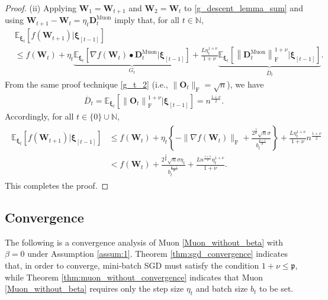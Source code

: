 \documentclass[twoside,11pt]{article}
\begin{document}
\begin{proof}
(ii) Applying $\bm{W}_1 = \bm{W}_{t+1}$ and $\bm{W}_2 = \bm{W}_t$ to \eqref{g_descent_lemma_sum} and using $\bm{W}_{t+1} - \bm{W}_t = \eta_t \bm{D}_t^{\mathrm{Muon}}$ imply that, for all $t \in \mathbb{N}$,
\begin{align*}
&\mathbb{E}_{\bm{\xi}_t} \left[ f(\bm{W}_{t+1})|\bm{\xi}_{[t-1]} \right]\\
&\leq 
f(\bm{W}_t) 
+ \eta_t 
\underbrace{\mathbb{E}_{\bm{\xi}_t} \left[ \nabla f (\bm{W}_t) \bullet \bm{D}_t^{\mathrm{Muon}} |\bm{\xi}_{[t-1]} \right]}_{G_t}
+ \frac{L \eta_t^{1 + \nu}}{1 + \nu} 
\underbrace{\mathbb{E}_{\bm{\xi}_t} \left[
\left\| \bm{D}_t^{\mathrm{Muon}} \right\|_{\mathrm{F}}^{1 + \nu} \Big| \bm{\xi}_{[t-1]} \right]}_{\overline{D}_t}.
\end{align*}
From the same proof technique \eqref{g_t_2} (i.e., $\|\bm{O}_t \|_{\mathrm{F}} = \sqrt{n}$), we have 
\begin{align}\label{bar_d_t}
\overline{D}_t
= 
\mathbb{E}_{\bm{\xi}_t} \left[
\left\| \bm{O}_t \right\|_{\mathrm{F}}^{1 + \nu} \Big| \bm{\xi}_{[t-1]} \right]
= n^{\frac{1 + \nu}{2}}.
\end{align}
Accordingly, for all $t \in \{0\} \cup \mathbb{N}$,
\begin{align}\label{ineq_muon_without}
\begin{split}
\mathbb{E}_{\bm{\xi}_t} \left[ f(\bm{W}_{t+1})|\bm{\xi}_{[t-1]} \right]
&\leq 
f(\bm{W}_t) 
+ \eta_t 
\left\{ - \| \nabla f (\bm{W}_t) \|_{\mathrm{F}}
+ 
\frac{2^{\frac{2}{\mathfrak{p}}} \sqrt{n} \sigma}{b_t^{\frac{\mathfrak{p} -1}{\mathfrak{p}}}} \right\} 
+ \frac{L \eta_t^{1 + \nu}}{1 + \nu} 
n^{\frac{1 + \nu}{2}}\\
&< 
f(\bm{W}_t)
+
\frac{2^{\frac{2}{\mathfrak{p}}} \sqrt{n} \sigma \eta_t}{b_t^{\frac{\mathfrak{p} -1}{\mathfrak{p}}}}
+ 
\frac{L n^{\frac{1 + \nu}{2}} \eta_t^{1 + \nu}}{1 + \nu}.
\end{split}  
\end{align}
This completes the proof.
\end{proof}

\subsection{Convergence}
The following is a convergence analysis of Muon \eqref{Muon_without_beta} with $\beta = 0$ under Assumption \ref{assum:1}. Theorem \ref{thm:sgd_convergence} indicates that, in order to converge, mini-batch SGD must satisfy the condition $1 + \nu \leq \mathfrak{p}$, while Theorem \ref{thm:muon_without_convergence} indicates that Muon \eqref{Muon_without_beta} requires only the step size $\eta_t$ and batch size $b_t$ to be set. 
\end{document}

